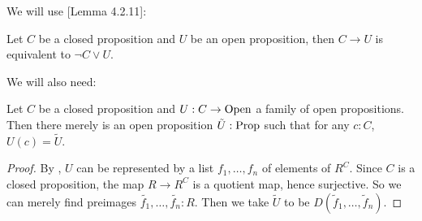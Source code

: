 
We will use \cite{draft}[Lemma 4.2.11]:

\begin{lemma}
  \label{closed-implies-open-to-or}
  Let $C$ be a closed proposition and $U$ be an open proposition,
  then $C\to U$ is equivalent to $\neg C \vee U$.
\end{lemma}

We will also need:

\begin{lemma}
  \label{commute-open-in-closed-prop}
  Let $C$ be a closed proposition and $U : C \to \mathrm{Open}$ a family of open propositions.
  Then there merely is an open proposition $\tilde{U} : \mathrm{Prop}$ such that for 
  any $c : C$, $U(c) = \tilde{U}$.
\end{lemma}

\begin{proof}
  By \cite[Theorem 4.2.6]{draft}, $U$ can be represented by a list $f_1,\ldots,f_n$
  of elements of $R^C$. Since $C$ is a closed proposition, the map $R \to R^C$ 
  is a quotient map, hence surjective. So we can merely find preimages
  $\tilde{f_1},\ldots,\tilde{f_n} : R$.
  Then we take $\tilde U$ to be $D(\tilde f_1,\ldots,\tilde f_n)$.
\end{proof}
